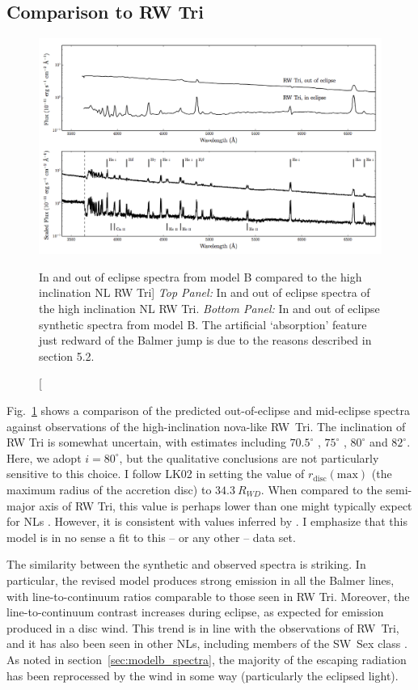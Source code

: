\subsection{Comparison to RW Tri}
\label{sec:rwtri}
\begin{figure}
\includegraphics[width=0.9\textheight, angle=270]{figures/05-cvpaper/fig13.png}
\caption
[In and out of eclipse spectra from model B compared to the high
inclination NL RW Tri]
{{\sl Top Panel:} In and out of eclipse spectra of the high
inclination NL RW Tri. {\sl Bottom Panel:} In and out of eclipse synthetic
spectra from model B.
The artificial `absorption' feature just redward of the Balmer jump
is due to the reasons described in section 5.2.}
\label{rwtricomp}
\end{figure}

Fig.~\ref{rwtricomp} shows a comparison of the predicted
out-of-eclipse and mid-eclipse spectra against observations of the
high-inclination nova-like RW~Tri. The inclination of RW Tri is
somewhat uncertain, with estimates including $70.5^\circ$
\citep{smak1995}, $75^\circ$ \citep{groot2004}, $80^\circ$
\citep{longmore1981} and $82^\circ$\citep{frankking1981}. Here, we
adopt $i = 80^\circ$, but the qualitative conclusions are not
particularly sensitive to this choice. 
I follow LK02 in setting the value of $r_{\mathrm{disc}}(\mathrm{max})$ (the maximum radius of the accretion disc)
to $34.3~R_{WD}$. When compared to the semi-major axis of RW Tri,
this value is perhaps lower than one might 
typically expect for NLs \citep{harropallinwarner1996}. 
However, it is consistent
with values inferred by \cite{rutten1992}.
I emphasize that this model is in no sense a fit to this -- or any other -- data set.


The similarity between the synthetic and observed spectra is
striking. In particular, the revised model produces strong emission in
all the Balmer lines, with line-to-continuum ratios comparable to
those seen in RW Tri. Moreover, the line-to-continuum contrast
increases during eclipse, as expected for emission produced in a disc
wind. This trend is in line with the observations of RW~Tri, and it
has also been seen in other NLs, including members of the SW~Sex class
\citep{neustroev2011}. As noted in section~\ref{sec:modelb_spectra}, the majority
of the escaping radiation has been reprocessed by the wind in some way
(particularly the eclipsed light).


